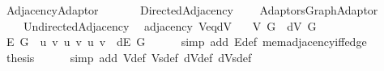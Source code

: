 %
\begin{isabellebody}%
%
%
\isadeliminvisible
%
\endisadeliminvisible
%
\isataginvisible
{}\isamarkupfalse%
\ Adjacency{\isacharunderscore}{\kern0pt}Adaptor\isanewline
\ \ \isanewline
\ \ \ \ Directed{\isacharunderscore}{\kern0pt}Adjacency\isanewline
\ \ \ \ {\isachardoublequoteopen}{\isachardot}{\kern0pt}{\isachardot}{\kern0pt}{\isacharslash}{\kern0pt}Adaptors{\isacharslash}{\kern0pt}Graph{\isacharunderscore}{\kern0pt}Adaptor{\isachardoublequoteclose}\isanewline
\ \ \ \ Undirected{\isacharunderscore}{\kern0pt}Adjacency\isanewline
{}\isanewline
\isanewline
{}\isamarkupfalse%
\ {\isacharparenleft}{\kern0pt}\ adjacency{\isacharparenright}{\kern0pt}\ V{\isacharunderscore}{\kern0pt}eq{\isacharunderscore}{\kern0pt}dV{\isacharcolon}{\kern0pt}\isanewline
\ \ \ {\isachardoublequoteopen}V\ G\ {\isacharequal}{\kern0pt}\ dV\ G{\isachardoublequoteclose}%
\endisataginvisible
{\isafoldinvisible}%
%
\isadeliminvisible
\isanewline
%
\endisadeliminvisible
%
\isadelimproof
%
\endisadelimproof
%
\isatagproof
{}\isamarkupfalse%
\ {\isacharminus}{\kern0pt}\isanewline
\ \ \isamarkupfalse%
\ {\isachardoublequoteopen}E\ G\ {\isacharequal}{\kern0pt}\ {\isacharbraceleft}{\kern0pt}{\isacharbraceleft}{\kern0pt}u{\isacharcomma}{\kern0pt}\ v{\isacharbraceright}{\kern0pt}\ {\isacharbar}{\kern0pt}u\ v{\isachardot}{\kern0pt}\ {\isacharparenleft}{\kern0pt}u{\isacharcomma}{\kern0pt}\ v{\isacharparenright}{\kern0pt}\ {\isasymin}\ dE\ G{\isacharbraceright}{\kern0pt}{\isachardoublequoteclose}\isanewline
\ \ \ \ \isamarkupfalse%
\ {\isacharparenleft}{\kern0pt}simp\ add{\isacharcolon}{\kern0pt}\ E{\isacharunderscore}{\kern0pt}def\ mem{\isacharunderscore}{\kern0pt}adjacency{\isacharunderscore}{\kern0pt}iff{\isacharunderscore}{\kern0pt}edge{\isacharparenright}{\kern0pt}\isanewline
\ \ \isamarkupfalse%
\ {\isacharquery}{\kern0pt}thesis\isanewline
\ \ \ \ \isamarkupfalse%
\ {\isacharparenleft}{\kern0pt}simp\ add{\isacharcolon}{\kern0pt}\ V{\isacharunderscore}{\kern0pt}def\ Vs{\isacharunderscore}{\kern0pt}def\ dV{\isacharunderscore}{\kern0pt}def\ dVs{\isacharunderscore}{\kern0pt}def{\isacharparenright}{\kern0pt}\isanewline
{}\isamarkupfalse%
%
\endisatagproof
{\isafoldproof}%
%
\isadelimproof
\isanewline
%
\endisadelimproof
%
\isadeliminvisible
\isanewline
%
\endisadeliminvisible
%
\isataginvisible
{}\isamarkupfalse%

\end{isabellebody}
